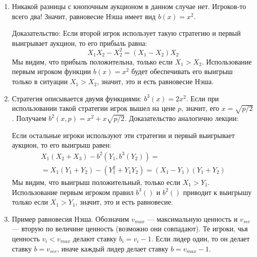 \begin{enumerate}
\item  Никакой разницы с кнопочным аукционом в данном случае нет. Игроков-то всего два! Значит, равновесие Нэша имеет вид $ b(x)=x^{2} $.

Доказательство:
Если второй игрок использует такую стратегию и первый выигрывает аукцион, то его прибыль равна:
\begin{equation}
X_{1}X_{2}-X_{2}^{2}=(X_{1}-X_{2})X_{2}
\end{equation}
Мы видим, что прибыль положительна, только если $ X_{1}>X_{2} $. Использование первым игроком функции $ b(x)=x^{2} $ будет обеспечивать его выигрыш только в ситуации $ X_{1}>X_{2} $, значит, это и есть равновесие Нэша.


\item Стратегия описывается двумя функциями: $ b^{3}(x)=2x^{2} $. Если при использовании такой стратегии игрок вышел на цене $ p $, значит, его $ x=\sqrt{p/2} $. Получаем $ b^{2}(x,p)=x^{2}+x\sqrt{p/2}$. Доказательство аналогично лекции:

Если остальные игроки используют эти стратегии и первый выигрывает аукцион, то его выигрыш равен:
\begin{multline}
X_{1}(X_{2}+X_{3})-b^{2}(Y_{1},b^{3}(Y_{2}))=\\
=X_{1}(Y_{1}+Y_{2})-(Y_{1}^{2}+Y_{1}Y_{2})=(X_{1}-Y_{1})(Y_{1}+Y_{2})
\end{multline}
Мы видим, что выигрыш положительный, только если $ X_{1}>Y_{1} $. Использование первым игроком правил $ b^{3}() $ и $ b^{2}() $ приводит к выигрышу только если $ X_{1}>Y_{1} $, значит, это и есть равновесие.


\item  Пример равновесия Нэша. Обозначим $ v_{max} $ — максимальную ценность и $ v_{sec} $ — вторую по величине ценность (возможно они совпадают). Те игроки, чья ценность $ v_{i}<v_{max} $ делают ставку $ b_{i}=v_{i}-1 $. Если лидер один, то он делает ставку $ b=v_{sec} $, иначе каждый лидер делает ставку $ b=v_{max}-1 $.


\end{enumerate}
